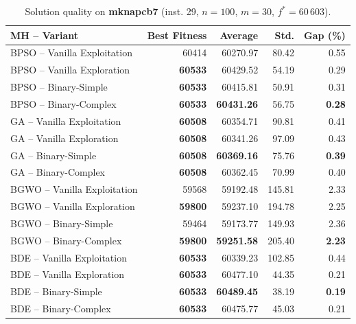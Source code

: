 \begin{table}[htbp]
  \centering
  \small
  \caption{Solution quality on \textbf{mknapcb7} (inst. 29, $n=100$, $m=30$, $f^*=60\,603$).}
  \label{tab:calidad_mknapcb7_29}
  \begin{tabular}{lrrrr}
    \toprule
    \textbf{MH -- Variant} &
    \textbf{Best Fitness} &
    \textbf{Average} &
    \textbf{Std.} &
    \textbf{Gap (\%)} \\
    \midrule
    BPSO -- Vanilla Exploitation &          60414 &         60270.97 &  80.42 &         0.55 \\
    BPSO -- Vanilla Exploration  & \textbf{60533} &         60429.52 &  54.19 &         0.29 \\
    BPSO -- Binary-Simple        & \textbf{60533} &         60415.81 &  50.91 &         0.31 \\
    BPSO -- Binary-Complex       & \textbf{60533} & \textbf{60431.26} &  56.75 & \textbf{0.28} \\
    \midrule
    GA -- Vanilla Exploitation   & \textbf{60508} &         60354.71 &  90.81 &         0.41 \\
    GA -- Vanilla Exploration    & \textbf{60508} &         60341.26 &  97.09 &         0.43 \\
    GA -- Binary-Simple          & \textbf{60508} & \textbf{60369.16} &  75.76 & \textbf{0.39} \\
    GA -- Binary-Complex         & \textbf{60508} &         60362.45 &  70.99 &         0.40 \\
    \midrule
    BGWO -- Vanilla Exploitation &          59568 &         59192.48 & 145.81 &         2.33 \\
    BGWO -- Vanilla Exploration  & \textbf{59800} &         59237.10 & 194.78 &         2.25 \\
    BGWO -- Binary-Simple        &          59464 &         59173.77 & 149.93 &         2.36 \\
    BGWO -- Binary-Complex       & \textbf{59800} & \textbf{59251.58} & 205.40 & \textbf{2.23} \\
    \midrule
    BDE -- Vanilla Exploitation  & \textbf{60533} &         60339.23 & 102.85 &         0.44 \\
    BDE -- Vanilla Exploration   & \textbf{60533} &         60477.10 &  44.35 &         0.21 \\
    BDE -- Binary-Simple         & \textbf{60533} & \textbf{60489.45} &  38.19 & \textbf{0.19} \\
    BDE -- Binary-Complex        & \textbf{60533} &         60475.77 &  45.03 &         0.21 \\
    \bottomrule
  \end{tabular}
\end{table}
